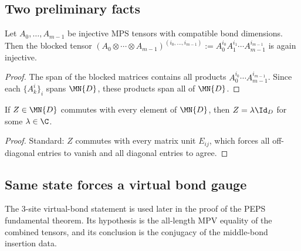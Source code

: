 \subsection{Two preliminary facts}
\label{sec:intermediate}

\begin{lemma}\label{lem:blocking_preserves_injectivity}
    \leanok
    Let $A_0, \ldots, A_{m-1}$ be injective MPS tensors with compatible
    bond dimensions.
    Then the blocked tensor
    $(A_0 \otimes \cdots \otimes A_{m-1})^{(i_0,\ldots,i_{m-1})}
        := A_0^{i_0} A_1^{i_1} \cdots A_{m-1}^{i_{m-1}}$
    is again injective.
\end{lemma}

\begin{proof}
    \leanok
    The span of the blocked matrices contains all products
    $A_0^{i_0} \cdots A_{m-1}^{i_{m-1}}$.
    Since each $\{A_k^i\}_i$ spans $\MN{D}$, these products span
    all of $\MN{D}$.
\end{proof}

\begin{lemma}[Centre of $\MN{D}$]\label{lem:center_scalar}
    \leanok
    If $Z \in \MN{D}$ commutes with every element of $\MN{D}$, then
    $Z = \lambda \Id_D$ for some $\lambda \in \C$.
\end{lemma}

\begin{proof}
    \leanok
    Standard: $Z$ commutes with every matrix unit $E_{ij}$, which
    forces all off-diagonal entries to vanish and all diagonal entries
    to agree.
\end{proof}

\subsection{Same state forces a virtual bond gauge}

The 3-site virtual-bond statement is used later in the proof of the PEPS
fundamental theorem. Its hypothesis is the all-length MPV equality of the
combined tensors, and its conclusion is the conjugacy of the middle-bond
insertion data.


